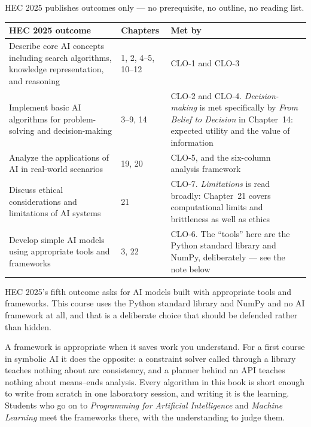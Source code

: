 HEC 2025 publishes outcomes only --- no prerequisite, no outline, no reading list.

\begin{longtable}{@{}L{7.6cm}L{2.0cm}L{5.4cm}@{}}
\toprule
{}
\textbf{HEC 2025 outcome} & \textbf{Chapters} & \textbf{Met by} \\
\midrule
\endhead
Describe core AI concepts including search algorithms, knowledge representation,
and reasoning & 1, 2, 4--5, 10--12 & CLO-1 and CLO-3 \\
Implement basic AI algorithms for problem-solving and decision-making & 3--9, 14 &
CLO-2 and CLO-4. \emph{Decision-making} is met specifically by \emph{From Belief
to Decision} in Chapter~14: expected utility and the value of information \\
Analyze the applications of AI in real-world scenarios & 19, 20 & CLO-5, and the
six-column analysis framework \\
Discuss ethical considerations and limitations of AI systems & 21 & CLO-7.
\emph{Limitations} is read broadly: Chapter~21 covers computational limits and
brittleness as well as ethics \\
Develop simple AI models using appropriate tools and frameworks & 3, 22 & CLO-6.
The ``tools'' here are the Python standard library and NumPy, deliberately ---
see the note below \\
\bottomrule
\end{longtable}

\begin{alertbox}
HEC 2025's fifth outcome asks for AI models built with appropriate tools and
frameworks. This course uses the Python standard library and NumPy and no AI
framework at all, and that is a deliberate choice that should be defended rather
than hidden.

A framework is appropriate when it saves work you understand. For a first course
in symbolic AI it does the opposite: a constraint solver called through a library
teaches nothing about arc consistency, and a planner behind an API teaches nothing
about means--ends analysis. Every algorithm in this book is short enough to write
from scratch in one laboratory session, and writing it is the learning. Students
who go on to \emph{Programming for Artificial Intelligence} and \emph{Machine
Learning} meet the frameworks there, with the understanding to judge them.
\end{alertbox}

